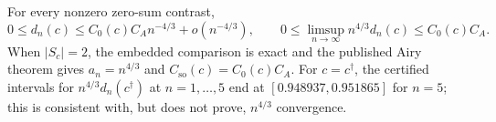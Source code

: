 For every nonzero zero-sum contrast, \[0\leq d_n(c)\leq C_0(c)C_A n^{-4/3}+o(n^{-4/3}),\qquad 0\leq\limsup_{n\to\infty}n^{4/3}d_n(c)\leq C_0(c)C_A.\] When \(|S_c|=2\), the embedded comparison is exact and the published Airy theorem gives \(a_n=n^{4/3}\) and \(C_{\mathrm{so}}(c)=C_0(c)C_A\). For \(c=c^\dagger\), the certified intervals for \(n^{4/3}d_n(c^\dagger)\) at \(n=1,\ldots,5\) end at \([0.948937,0.951865]\) for \(n=5\); this is consistent with, but does not prove, \(n^{4/3}\) convergence.